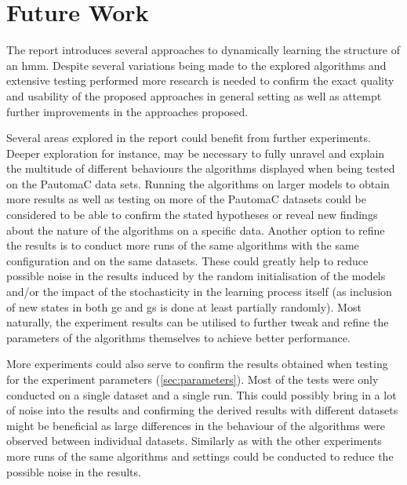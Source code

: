 \chapter{Future Work}
\label{chap:future_work}
The report introduces several approaches to dynamically learning the structure of an \gls{hmm}. Despite several variations being made to the explored algorithms and extensive testing performed more research is needed to confirm the exact quality and usability of the proposed approaches in general setting as well as attempt further improvements in the approaches proposed.

Several areas explored in the report could benefit from further experiments. Deeper exploration for instance, may be necessary to fully unravel and explain the multitude of different behaviours the algorithms displayed when being tested on the PautomaC data sets. Running the algorithms on larger models to obtain more results as well as testing on more of the PautomaC datasets could be considered to be able to confirm the stated hypotheses or reveal new findings about the nature of the algorithms on a specific data. Another option to refine the results is to conduct more runs of the same algorithms with the same configuration and on the same datasets. These could greatly help to reduce possible noise in the results induced by the random initialisation of the models and/or the impact of the stochasticity in the learning process itself (as inclusion of new states in both \acrlong{ge} and \acrlong{gs} is done at least partially randomly).
Most naturally, the experiment results can be utilised to further tweak and refine the parameters of the algorithms themselves to achieve better performance.

More experiments could also serve to confirm the results obtained when testing for the experiment parameters (\ref{sec:parameters}). Most of the tests were only conducted on a single dataset and a single run. This could possibly bring in a lot of noise into the results and confirming the derived results with different datasets might be beneficial as large differences in the behaviour of the algorithms were observed between individual datasets. Similarly as with the other experiments more runs of the same algorithms and settings could be conducted to reduce the possible noise in the results.

